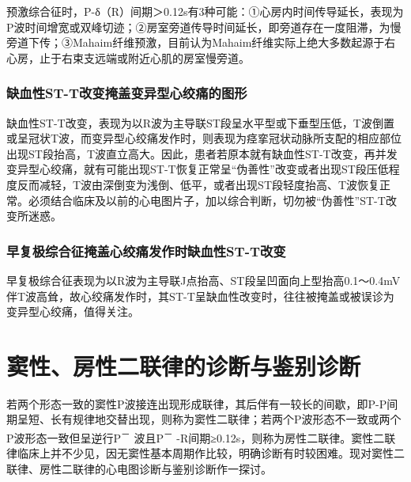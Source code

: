 预激综合征时，P-δ（R）间期＞0.12s有3种可能：①心房内时间传导延长，表现为P波时间增宽或双峰切迹；②房室旁道传导时间延长，即旁道存在一度阻滞，为慢旁道下传；③Mahaim纤维预激，目前认为Mahaim纤维实际上绝大多数起源于右心房，止于右束支远端或附近心肌的房室慢旁道。

\protect\hypertarget{text00043.htmlux5cux23subid480}{}{}

\subsection{缺血性ST-T改变掩盖变异型心绞痛的图形}

缺血性ST-T改变，表现为以R波为主导联ST段呈水平型或下垂型压低，T波倒置或呈冠状T波，而变异型心绞痛发作时，则表现为痉挛冠状动脉所支配的相应部位出现ST段抬高，T波直立高大。因此，患者若原本就有缺血性ST-T改变，再并发变异型心绞痛，就有可能出现ST-T恢复正常呈“伪善性”改变或者出现ST段压低程度反而减轻，T波由深倒变为浅倒、低平，或者出现ST段轻度抬高、T波恢复正常。必须结合临床及以前的心电图片子，加以综合判断，切勿被“伪善性”ST-T改变所迷惑。

\protect\hypertarget{text00043.htmlux5cux23subid481}{}{}

\subsection{早复极综合征掩盖心绞痛发作时缺血性ST-T改变}

早复极综合征表现为以R波为主导联J点抬高、ST段呈凹面向上型抬高0.1～0.4mV伴T波高耸，故心绞痛发作时，其ST-T呈缺血性改变时，往往被掩盖或被误诊为变异型心绞痛，值得关注。

\protect\hypertarget{text00044.html}{}{}

\protect\hypertarget{text00044.htmlux5cux23chapter44}{}{}

\chapter{窦性、房性二联律的诊断与鉴别诊断}

若两个形态一致的窦性P波接连出现形成联律，其后伴有一较长的间歇，即P-P间期呈短、长有规律地交替出现，则称为窦性二联律；若两个P波形态不一致或两个P波形态一致但呈逆行P\textsuperscript{－}
波且P\textsuperscript{－}
-R间期≥0.12s，则称为房性二联律。窦性二联律临床上并不少见，因无窦性基本周期作比较，明确诊断有时较困难。现对窦性二联律、房性二联律的心电图诊断与鉴别诊断作一探讨。

\protect\hypertarget{text00044.htmlux5cux23subid482}{}{}

